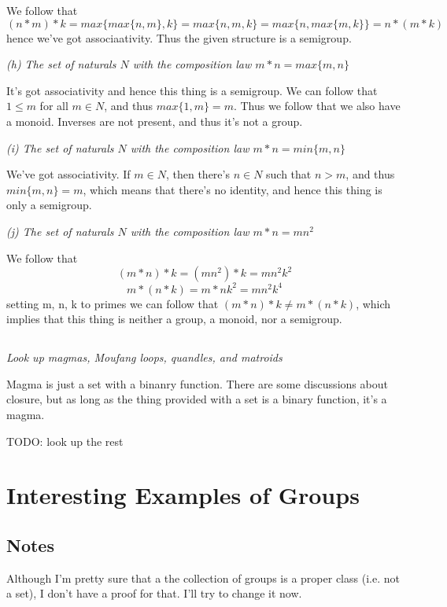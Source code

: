 \documentclass[11pt,oneside,titlepage]{book}
\newcommand{\set}[1]{\{ #1 \}}
\begin{document}
We follow that
$$(n * m) * k = max\set{max\set{n, m}, k} = max\set{n, m, k} = max\set{n, max\set{m, k}} = n * (m * k)$$
hence we've got associaativity. Thus the given structure is a semigroup.

\textit{(h) The set of naturals $N$ with the composition law $m * n = max\set{m, n}$}

It's got associativity and hence this thing is a semigroup. We can follow that
$1 \leq m$ for all $m \in N$, and thus $max\set{1, m} = m$. Thus we follow that we also
have a monoid. Inverses are not present, and thus it's not a group.

\textit{(i) The set of naturals $N$ with the composition law $m * n = min\set{m, n}$}

We've got associativity. If $m \in N$, then there's $n \in N$ such that $n > m$, and thus
$min\set{m, n} = m$, which means that there's no identity, and hence this thing is only a semigroup.

\textit{(j) The set of naturals $N$ with the composition law $m * n = mn^2$}

We follow that
$$(m * n) * k = (mn^2) * k = mn^2k^2$$
$$m * (n * k) = m * nk^2 = mn^2k^4$$
setting m, n, k to primes we can follow that $(m * n) * k \neq m * (n * k)$, which implies that
this thing is neither a group, a monoid, nor a semigroup.

\subsection{}

\textit{Look up magmas, Moufang loops, quandles, and matroids}

Magma is just a set with a binanry function. There are some
discussions about closure, but as long as the thing provided with a
set is a binary function, it's a magma.

TODO: look up the rest

\section{Interesting Examples of Groups}

\subsection*{Notes}

Although I'm pretty sure that a the collection of groups is a proper class
(i.e. not a set), I don't have a proof for that. I'll try to change it now.
\end{document}
